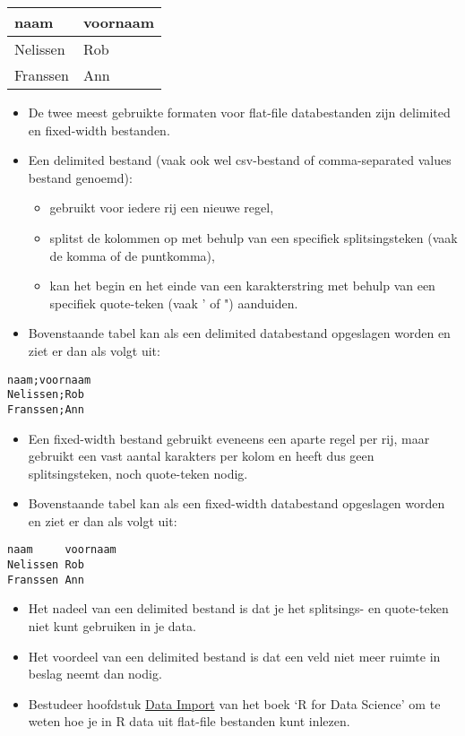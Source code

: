 \documentclass[]{memoir}
\providecommand{\tightlist}{%
  \setlength{\itemsep}{0pt}\setlength{\parskip}{0pt}}
\begin{document}
\begin{longtable}[]{@{}ll@{}}
\toprule
naam & voornaam\tabularnewline
\midrule
\endhead
Nelissen & Rob\tabularnewline
Franssen & Ann\tabularnewline
\bottomrule
\end{longtable}

\begin{itemize}
\tightlist
\item
  De twee meest gebruikte formaten voor flat-file databestanden zijn delimited en fixed-width bestanden.
\item
  Een delimited bestand (vaak ook wel csv-bestand of comma-separated values bestand genoemd):

  \begin{itemize}
  \tightlist
  \item
    gebruikt voor iedere rij een nieuwe regel,
  \item
    splitst de kolommen op met behulp van een specifiek splitsingsteken (vaak de komma of de puntkomma),
  \item
    kan het begin en het einde van een karakterstring met behulp van een specifiek quote-teken (vaak ' of ") aanduiden.
  \end{itemize}
\item
  Bovenstaande tabel kan als een delimited databestand opgeslagen worden en ziet er dan als volgt uit:
\end{itemize}

\begin{verbatim}
naam;voornaam
Nelissen;Rob
Franssen;Ann
\end{verbatim}

\begin{itemize}
\tightlist
\item
  Een fixed-width bestand gebruikt eveneens een aparte regel per rij, maar gebruikt een vast aantal karakters per kolom en heeft dus geen splitsingsteken, noch quote-teken nodig.
\item
  Bovenstaande tabel kan als een fixed-width databestand opgeslagen worden en ziet er dan als volgt uit:
\end{itemize}

\begin{verbatim}
naam     voornaam
Nelissen Rob
Franssen Ann
\end{verbatim}

\begin{itemize}
\tightlist
\item
  Het nadeel van een delimited bestand is dat je het splitsings- en quote-teken niet kunt gebruiken in je data.
\item
  Het voordeel van een delimited bestand is dat een veld niet meer ruimte in beslag neemt dan nodig.
\item
  Bestudeer hoofdstuk \href{http://r4ds.had.co.nz/data-import.html}{Data Import} van het boek `R for Data Science' om te weten hoe je in R data uit flat-file bestanden kunt inlezen.
\end{itemize}
\end{document}
